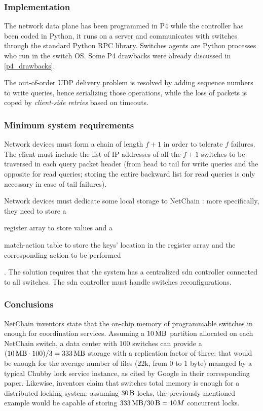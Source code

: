 \subsubsection{Implementation}
The network data plane has been programmed in P4 \cite{p4} while the controller has been coded in Python, it runs on a server and communicates with switches through the standard Python RPC library.
Switches agents are Python processes who run in the switch OS. Some P4 \cite{p4} drawbacks were already discussed in \cref{p4_drawbacks}.\par
The out-of-order UDP delivery problem is resolved by adding sequence numbers to write queries, hence serializing those operations, while the loss of packets is coped by \textit{client-side retries} based on timeouts.

\subsubsection{Minimum system requirements}
Network devices must form a chain of length $f + 1$ in order to tolerate $f$ failures. The client must include the list of IP addresses of all the $f + 1$ switches to be traversed in each query packet header (from head to tail for write queries and the opposite
for read queries; storing the entire backward list for read queries is only necessary in case of tail failures).\par
Network devices must dedicate some local storage to NetChain \cite{netchain}: more specifically, they need to store a
\begin{mylist}
    \item register array to store values and a
    \item match-action table to store the keys' location in the register array and the corresponding action to be performed
\end{mylist}.
The solution requires that the system has a centralized \gls{sdn} controller connected to all switches.
The \gls{sdn} controller must handle switches reconfigurations.

\subsubsection{Conclusions}
NetChain \cite{netchain} inventors state that the on-chip memory of programmable switches in enough for coordination services.
Assuming a $\SI{10}{\mega\byte}$ partition allocated on each NetChain \cite{netchain} switch, a data center with 100 switches can provide a $(\SI{10}{\mega\byte} \cdot 100) / 3 = \SI{333}{\mega\byte}$ storage with a replication factor of three: that would be enough for the average number of files (22k, from 0 to 1 byte) managed by a typical Chubby \cite{chubby} lock service instance, as cited by Google in their corresponding paper.
Likewise, inventors claim that switches total memory is enough for a distributed locking system: assuming $\SI{30}{\byte}$ locks, the previously-mentioned example would be capable of storing $\SI{333}{\mega\byte} / \SI{30}{\byte} = 10M$ concurrent locks.